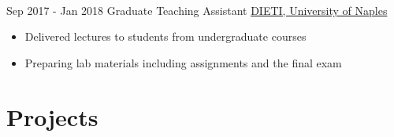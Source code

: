 \documentclass[letterpaper]{twentysecondcv} %
\begin{document}
\begin{twenty}
{\begin{itemize}
            \end{itemize}
        }\\
    \twentyitem
   		{Sep 2017 -}
		{Jan 2018}
        {Graduate Teaching Assistant}
        {\href{http://www.scuolapsb.unina.it/}{DIETI, University of Naples}}
        {}
        {
            \begin{itemize}
                \item Delivered lectures to students from undergraduate courses
                \item Preparing lab materials including assignments and the final exam
            \end{itemize}
        }
\end{twenty}


\section{Projects}
\end{document}
